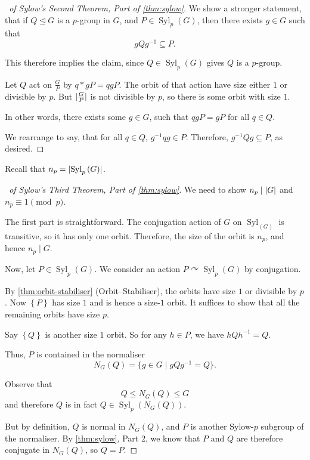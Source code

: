 \documentclass{article}
\theoremstyle{definition}
\theoremstyle{remark}
\DeclarePairedDelimiter{\abs}{\lvert}{\rvert}
\newcommand{\pqty}[1]{\left(#1\right)}
\newcommand{\Bqty}[1]{\left\{#1\right\}}
\newcommand{\set}[2]{\{#1\mid #2\}}
\newcommand{\flatfrac}[2]{\frac{#1}{#2}}
\newcommand{\inverse}{^{-1}}
\newcommand{\normalsub}{\trianglelefteq}
\newcommand{\subgroup}{\leq}
\newcommand{\actson}{\curvearrowright}
\newcommand{\divides}{\mid}
\newcommand{\Syl}{\operatorname{Syl}}
\begin{document}
\begin{proof}[\proofname\ of Sylow's Second Theorem, Part of \autoref{thm:sylow}]
    We show a stronger statement, that if \(Q \normalsub G\) is a \(p\)-group in \(G\), and \(P \in \Syl_p\pqty{G}\), then there exists \(g \in G\) such that
    \[
        g Q g\inverse \subseteq P.
    \]

    This therefore implies the claim, since \(Q \in \Syl_p\pqty{G}\) gives \(Q\) is a \(p\)-group.

    Let \(Q\) act on \(\flatfrac{G}{P}\) by \(q \ast gP = q gP\). The orbit of that action have size either \(1\) or divisible by \(p\). But \(\abs{\flatfrac{G}{P}}\) is not divisible by \(p\), so there is some orbit with size \(1\).

    In other words, there exists some \(g \in G\), such that \(qgP = gP\) for all \(q \in Q\).

    We rearrange to say, that for all \(q \in Q\), \(g \inverse q g \in P\). Therefore, \(g \inverse Q g \subseteq P\), as desired.
\end{proof}

Recall that \(n_p = \abs{\Syl_p\pqty{G}}\).

\begin{proof}[\proofname\ of Sylow's Third Theorem, Part of \autoref{thm:sylow}]
    We need to show \(n_p \divides \abs{G}\) and \(n_p \equiv 1 \pmod{p}\).

    The first part is straightforward. The conjugation action of \(G\) on \(\Syl_{\pqty{G}}\) is transitive, so it has only one orbit. Therefore, the size of the orbit is \(n_p\), and hence \(n_p \divides G\).

    Now, let \(P \in \Syl_p\pqty{G}\). We consider an action \(P \actson \Syl_p\pqty{G}\) by conjugation.

    By \autoref{thm:orbit-stabiliser} (Orbit--Stabiliser), the orbits have size \(1\) or divisible by \(p\). Now \(\Bqty{P}\) has size \(1\) and is hence a size-\(1\) orbit. It suffices to show that all the remaining orbits have size \(p\).

    Say \(\Bqty{Q}\) is another size \(1\) orbit. So for any \(h \in P\), we have \(h Q h\inverse = Q\).

    Thus, \(P\) is contained in the normaliser
    \[
        N_G\pqty{Q} = \set{g \in G}{g Q g\inverse = Q}.
    \]

    Observe that
    \[
        Q \subgroup N_G\pqty{Q} \subgroup G
    \]
    and therefore \(Q\) is in fact \(Q \in \Syl_p \pqty{N_G\pqty{Q}}\).

    But by definition, \(Q\) is normal in \(N_G\pqty{Q}\), and \(P\) is another Sylow-\(p\) subgroup of the normaliser. By \autoref{thm:sylow}, Part 2, we know that \(P\) and \(Q\) are therefore conjugate in \(N_G\pqty{Q}\), so \(Q = P\).
\end{proof}
\end{document}
